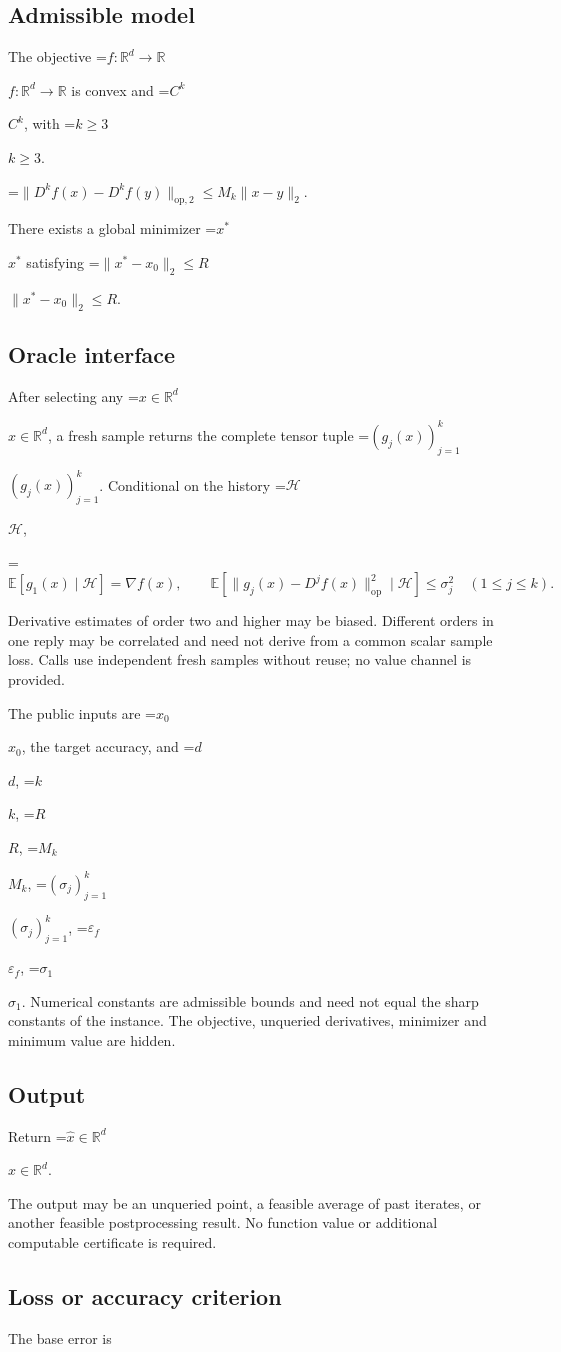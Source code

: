 \documentclass[10pt,a4paper]{article}
\newcommand{\AtlasMath}[1]{\par\begingroup\centering\setbox0=\hbox{$\displaystyle #1$}\ifdim\wd0>1.4\linewidth\typeout{ATLAS WIDE FORMULA: \the\wd0}\fi\ifdim\wd0>\linewidth\resizebox{\linewidth}{!}{\box0}\else\box0\fi\par\endgroup}
\newcommand{\AtlasInlineMath}[1]{\begingroup\setbox0=\hbox{$#1$}\ifdim\wd0>.4\linewidth\endgroup\AtlasMath{#1}\else\endgroup$#1$\fi}
\begin{document}
\subsection{Admissible model}
The objective \AtlasInlineMath{f:\mathbb{R}^d\to\mathbb{R}} is convex and \AtlasInlineMath{C^k}, with \AtlasInlineMath{k\ge3}.


\AtlasMath{\|D^{k}f(x)-D^{k}f(y)\|_{\mathrm{op},2}\le M_k\|x-y\|_{2}.}


There exists a global minimizer \AtlasInlineMath{x^*} satisfying \AtlasInlineMath{\|x^*-x_0\|_2\le R}.

\subsection{Oracle interface}
After selecting any \AtlasInlineMath{x\in\mathbb{R}^d}, a fresh sample returns the complete tensor tuple \AtlasInlineMath{(g_j(x))_{j=1}^k}. Conditional on the history \AtlasInlineMath{\mathcal{H}},


\AtlasMath{\mathbb{E}[g_1(x)\mid\mathcal{H}]=\nabla f(x),\qquad\mathbb{E}[\|g_j(x)-D^jf(x)\|_{\mathrm{op}}^2\mid\mathcal{H}]\le\sigma_j^2\quad(1\le j\le k).}


Derivative estimates of order two and higher may be biased. Different orders in one reply may be correlated and need not derive from a common scalar sample loss. Calls use independent fresh samples without reuse; no value channel is provided.

The public inputs are \AtlasInlineMath{x_0}, the target accuracy, and \AtlasInlineMath{d}, \AtlasInlineMath{k}, \AtlasInlineMath{R}, \AtlasInlineMath{M_k}, \AtlasInlineMath{(\sigma_j)_{j=1}^k}, \AtlasInlineMath{\varepsilon_f}, \AtlasInlineMath{\sigma_1}. Numerical constants are admissible bounds and need not equal the sharp constants of the instance. The objective, unqueried derivatives, minimizer and minimum value are hidden.

\subsection{Output}
Return \AtlasInlineMath{\widehat{x}\in \mathbb{R}^d}.

The output may be an unqueried point, a feasible average of past iterates, or another feasible postprocessing result. No function value or additional computable certificate is required.

\subsection{Loss or accuracy criterion}
The base error is
\end{document}
